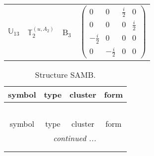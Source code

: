 \documentclass[fleqn,10pt,landscape]{article}
\begin{document}
\begin{itemize}
\begin{center}
\begin{longtable}{c|c|c|c}
$ \mathbb{U}_{13} $ & $\mathbb{T}_{2}^{(u,A_{2})}$ & B$_{3}$ & $\begin{pmatrix} 0 & 0 & \frac{i}{2} & 0 \\ 0 & 0 & 0 & \frac{i}{2} \\ - \frac{i}{2} & 0 & 0 & 0 \\ 0 & - \frac{i}{2} & 0 & 0 \end{pmatrix}$ \\
\end{longtable}
\end{center}
\begin{center}
\renewcommand{\arraystretch}{1.3}
\begin{longtable}{c|c|c|c}
\caption{Structure SAMB.}
 \\
 \hline \hline
symbol & type & cluster & form \\ \hline \endfirsthead

\multicolumn{3}{l}{\tablename\ \thetable{}} \\
 \hline \hline
symbol & type & cluster & form \\ \hline \endhead

 \hline \hline
\multicolumn{3}{r}{\footnotesize\it continued ...} \\ \endfoot

 \hline \hline
\multicolumn{3}{r}{} \\ \endlastfoot


\end{longtable}
\end{center}
\end{itemize}
\end{document}
